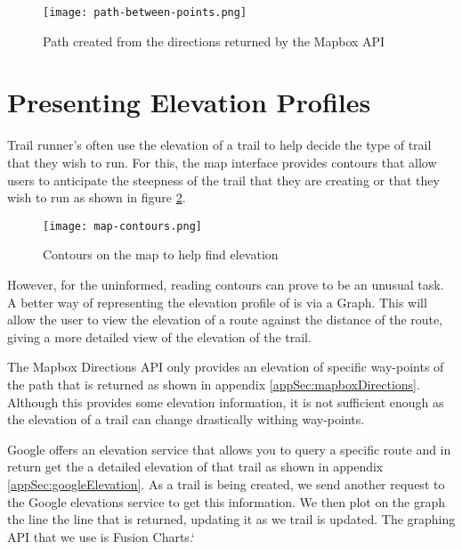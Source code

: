 \begin{figure}[htb!]
    \centering
    \texttt{[image: path-between-points.png]}
    \caption{Path created from the directions returned by the Mapbox API}
    \label{fig:PathCreated}
\end{figure}

\section{Presenting Elevation Profiles} \label{elevationProfile}
Trail runner's often use the elevation of a trail to help decide the type of trail that they wish to run. For this, the map interface provides contours that allow users to anticipate the steepness of the trail that they are creating or that they wish to run as shown in figure \ref{fig:MapContours}.

\begin{figure}[htb!]
    \centering
    \texttt{[image: map-contours.png]}
    \caption{Contours on the map to help find elevation}
    \label{fig:MapContours}
\end{figure}


However, for the uninformed, reading contours can prove to be an unusual task. A better way of representing the elevation profile of is via a Graph. This will allow the user to view the elevation of a route against the distance of the route, giving a more detailed view of the elevation of the trail.

The Mapbox Directions API only provides an elevation of specific way-points of the path that is returned as shown in appendix \ref{appSec:mapboxDirections}. Although this provides some elevation information, it is not sufficient enough as the elevation of a trail can change drastically withing way-points.

Google offers an elevation service that allows you to query a specific route and in return get the a detailed elevation of that trail as shown in appendix \ref{appSec:googleElevation}. As a trail is being created, we send another request to the Google elevations service to get this information. We then plot on the graph the line the line that is returned, updating it as we trail is updated. The graphing API that we use is Fusion Charts\cite{fusionCharts}.`